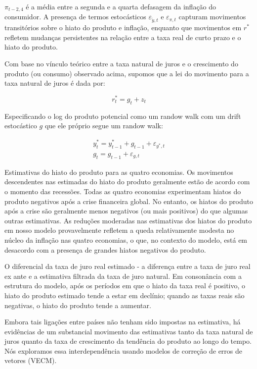 $\pi_{t-2,4} $ é a média entre a segunda e a quarta defasagem da inflação do consumidor. A presença de termos estocásticos $\varepsilon_{\tilde{y},t} $ e $\varepsilon_{\pi,t} $ capturam movimentos transitórios sobre o hiato do produto e inflação, enquanto que movimentos em $r^{*}$ refletem mudanças persistentes na relação entre a taxa real de curto prazo e o hiato do produto.

Com base no vínculo teórico entre a taxa natural de juros e o crescimento do produto (ou consumo) observado acima, supomos que a lei do movimento para a taxa natural de juros é dada por:

\begin{equation}
    r_t^{*} = g_t + z_t
\end{equation}

Especificando o log do produto potencial como um randow walk com um drift estocástico $g$ que ele próprio segue um randow walk:

\begin{eqnarray}
    y^{*}_t = y^{*}_{t-1} + g_{t-1} + \varepsilon_{y^{*},t} \\
    g_t = g_{t-1} + \varepsilon_{g,t}
\end{eqnarray}

Estimativas do hiato do produto para as quatro economias. Os movimentos descendentes nas estimadas do hiato do produto geralmente estão de acordo com o momento das recessões. Todas as quatro economias experimentam hiatos do produto negativos após a crise financeira global. No entanto, os hiatos do produto após a crise são geralmente menos negativos (ou mais positivos) do que algumas outras estimativas. As reduções moderadas nas estimativas dos hiatos do produto em nosso modelo provavelmente refletem a queda relativamente modesta no núcleo da inflação nas quatro economias, o que, no contexto do modelo, está em desacordo com a presença de grandes hiatos negativos do produto.

O diferencial da taxa de juro real estimado - a diferença entre a taxa de juro real ex ante e a estimativa filtrada da taxa de juro natural. Em consonância com a estrutura do modelo, após os períodos em que o hiato da taxa real é positivo, o hiato do produto estimado tende a estar em declínio; quando as taxas reais são negativas, o hiato do produto tende a aumentar.

Embora tais ligações entre países não tenham sido impostas na estimativa, há evidências de um substancial movimento das estimativas tanto da taxa natural de juros quanto da taxa de crescimento da tendência do produto ao longo do tempo. Nós exploramos essa interdependência usando modelos de correção de erros de vetores (VECM).

